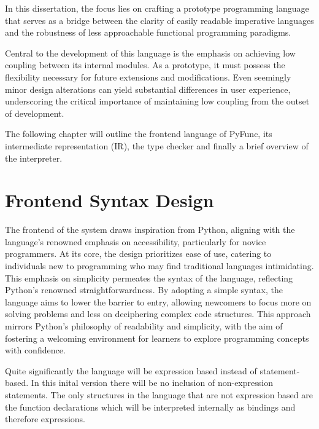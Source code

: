 \documentclass{l4proj}
\begin{document}

In this dissertation, the focus lies on crafting a prototype programming language that serves as a bridge between the clarity of easily readable imperative languages and the robustness of less approachable functional programming paradigms.

Central to the development of this language is the emphasis on achieving low coupling between its internal modules.
As a prototype, it must possess the flexibility necessary for future extensions and modifications.
Even seemingly minor design alterations can yield substantial differences in user experience, underscoring the critical importance of maintaining low coupling from the outset of development.

The following chapter will outline the frontend language of PyFunc, its intermediate representation (IR), the type checker and finally a brief overview of the interpreter.

\section{Frontend Syntax Design} \label{sec:frontend-syntax-design}

The frontend of the system draws inspiration from Python, aligning with the language's renowned emphasis on accessibility, particularly for novice programmers.
At its core, the design prioritizes ease of use, catering to individuals new to programming who may find traditional languages intimidating.
This emphasis on simplicity permeates the syntax of the language, reflecting Python's renowned straightforwardness.
By adopting a simple syntax, the language aims to lower the barrier to entry, allowing newcomers to focus more on solving problems and less on deciphering complex code structures.
This approach mirrors Python's philosophy of readability and simplicity, with the aim of fostering a welcoming environment for learners to explore programming concepts with confidence.

Quite significantly the language will be expression based instead of statement-based.
In this inital version there will be no inclusion of non-expression statements.
The only structures in the language that are not expression based are the function declarations which will be interpreted internally as bindings and therefore expressions.


\end{document}
